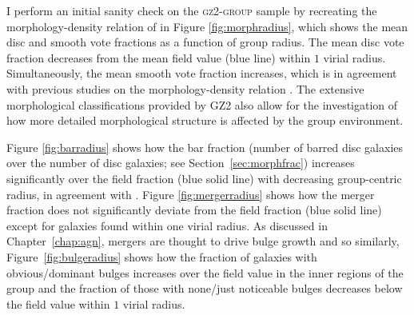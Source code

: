 I perform an initial sanity check on the \textsc{gz2-group} sample by recreating the morphology-density relation of \citet[][see Figure~\ref{fig:dressler}]{dressler80} in Figure \ref{fig:morphradius}, which shows the mean disc and smooth vote fractions as a function of group radius. The mean disc vote fraction decreases from the mean field value (blue line) within $1$ virial radius. Simultaneously, the mean smooth vote fraction increases, which is in agreement with previous studies on the morphology-density relation \citep{dressler80, smail97, poggianti99, postman05, Bamford09}. The extensive morphological classifications provided by GZ2 also allow for the investigation of how more detailed morphological structure is affected by the group environment.  

Figure \ref{fig:barradius} shows how the bar fraction (number of barred disc galaxies over the number of disc galaxies; see Section~\ref{sec:morphfrac}) increases significantly over the field fraction (blue solid line) with decreasing group-centric radius, in agreement with \cite{barazza09}. Figure \ref{fig:mergerradius} shows how the merger fraction does not significantly deviate from the field fraction (blue solid line) except for galaxies found within one virial radius. As discussed in Chapter~\ref{chap:agn}, mergers are thought to drive bulge growth and so similarly, Figure~\ref{fig:bulgeradius} shows how the fraction of galaxies with obvious/dominant bulges increases over the field value in the inner regions of the group and the fraction of those with none/just noticeable bulges decreases below the field value within $1$ virial radius. 




